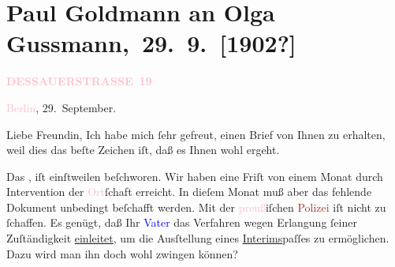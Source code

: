 

\renewcommand{\erwaehntePersonen}{Personen: Paul Goldmann, Rudolf Gussmann, Olga Schnitzler, Heinrich Schnitzler, Elisabeth Steinrück}
\renewcommand{\erwaehnteInstitutionen}{Institutionen: Preußische Polzei, Schiller-Theater}
\renewcommand{\erwaehnteOrte}{Orte: Berlin, Dessauer Straße, Gentzgasse, Hinterbrühl, Preußen, Wien}
\renewcommand{\erwaehnteWerke}{}
\section[ Paul Goldmann an Olga Gussmann, 29. 9. {[}1902?{]}]{Paul Goldmann an Olga Gussmann, 29. 9. {[}1902?{]}}
\nopagebreak{}
\rehead{ }\normalsize\beginnumbering{}
\toendnotes[C]{\smallbreak\pagebreak[2]}
\toendnotes[C]{\smallbreak}
\pstart
           \noindent{}\raggedleft{}{\pb}\textcolor{gray}{\textbf{\textcolor{pink}{DESSAUERSTRASSE 19}{}\ledrightnote{\textcolor{pink}{Dessauer Straße}}}}\pend
           
\pstart
           \textcolor{pink}{Berlin}{}\ledrightnote{\textcolor{pink}{Berlin}}, 29. September.\pend
           
\pstart\center{}Liebe Freundin,\pend
\pstart
           Ich habe mich ſehr gefreut, einen Brief von Ihnen zu erhalten, weil dies das beſte
               Zeichen iſt, daß es Ihnen wohl ergeht.\pend
           
\pstart
           Das \label{K_L03534-1v}\label{K_L03534-1h},
               iſt einſtweilen beſchworen. Wir haben eine Friſt von einem Monat durch Intervention
               der \textcolor{pink}{Ort}{}\ledrightnote{{$\rightarrow$}\textcolor{pink}{Berlin}}ſchaft erreicht. In
               dieſem Monat muß aber das fehlende Dokument {\pb}unbedingt beſchafft werden. Mit der \textcolor{pink}{preuß}{}\ledrightnote{{$\rightarrow$}\textcolor{pink}{Preußen}}iſchen \textcolor{brown}{Polizei}{}\ledrightnote{\textcolor{brown}{Preußische Polzei}} iſt nicht zu ſchaffen. Es genügt, daß Ihr \textcolor{blue}{Vater}{}\ledrightnote{{$\rightarrow$}\textcolor{blue}{Rudolf Gussmann}} das Verfahren wegen Erlangung ſeiner
               Zuſtändigkeit \uline{einleitet}, um die Ausſtellung eines \uline{Interims}paſſes zu ermöglichen. Dazu wird man ihn doch
               wohl zwingen können?\pend
           
